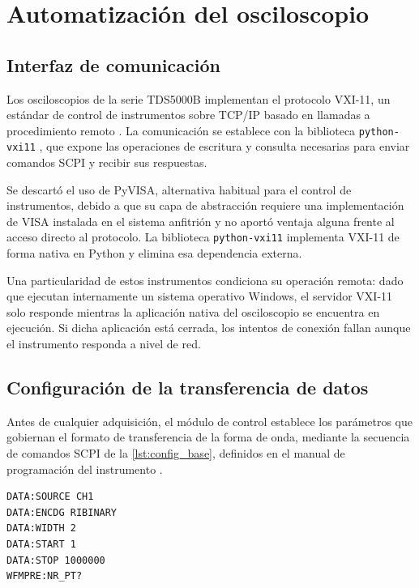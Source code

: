 \section{Automatización del osciloscopio}
\label{sec:auto_osci}

\subsection*{Interfaz de comunicación}

Los osciloscopios de la serie TDS5000B implementan el protocolo
VXI-11, un estándar de control de instrumentos sobre TCP/IP basado en
llamadas a procedimiento remoto \cite{VXI11}. La comunicación se
establece con la biblioteca \texttt{python-vxi11} \cite{PythonVXI11},
que expone las operaciones de
escritura y consulta necesarias para enviar comandos SCPI y recibir
sus respuestas.

Se descartó el uso de PyVISA, alternativa habitual para el control de
instrumentos, debido a que su capa de abstracción requiere una
implementación de VISA instalada en el sistema anfitrión y no aportó
ventaja alguna frente al acceso directo al protocolo. La biblioteca
\texttt{python-vxi11} implementa VXI-11 de forma nativa en Python y
elimina esa dependencia externa.

Una particularidad de estos instrumentos condiciona su operación
remota: dado que ejecutan internamente un sistema operativo Windows,
el servidor VXI-11 solo responde mientras la aplicación nativa del
osciloscopio se encuentra en ejecución. Si dicha aplicación está
cerrada, los intentos de conexión fallan aunque el instrumento
responda a nivel de red.

\subsection*{Configuración de la transferencia de datos}

Antes de cualquier adquisición, el módulo de control establece los
parámetros que gobiernan el formato de transferencia de la forma de
onda, mediante la secuencia de comandos SCPI de la
\cref{lst:config_base}, definidos en el manual de programación del
instrumento \cite{TektronixTDS5000B}.

\begin{lstlisting}[caption={Configuración base de la transferencia de
    forma de onda.},
    label={lst:config_base},
    language={}]
DATA:SOURCE CH1
DATA:ENCDG RIBINARY
DATA:WIDTH 2
DATA:START 1
DATA:STOP 1000000
WFMPRE:NR_PT?
\end{lstlisting}

